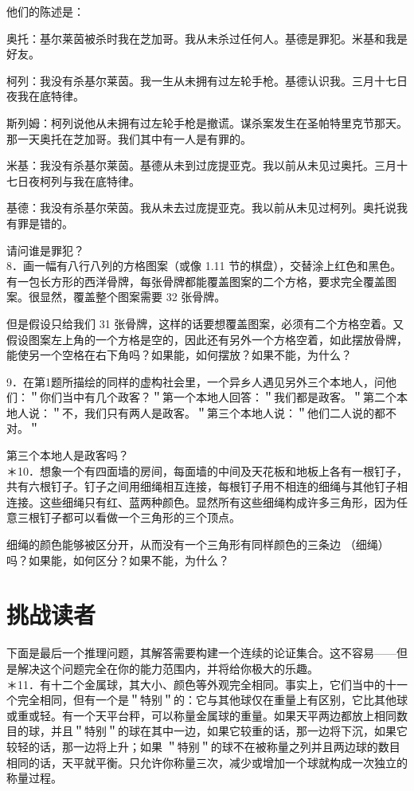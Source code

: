 他们的陈述是：

奥托：基尔莱茵被杀时我在芝加哥。我从未杀过任何人。基德是罪犯。米基和我是好友。

柯列：我没有杀基尔莱茵。我一生从未拥有过左轮手枪。基德认识我。三月十七日夜我在底特律。

斯列姆：柯列说他从未拥有过左轮手枪是撤谎。谋杀案发生在圣帕特里克节那天。那一天奥托在芝加哥。我们其中有一人是有罪的。

米基：我没有杀基尔莱茵。基德从未到过庞提亚克。我以前从未见过奥托。三月十七日夜柯列与我在底特律。

基德：我没有杀基尔荣茵。我从未去过庞提亚克。我以前从未见过柯列。奥托说我有罪是错的。

请问谁是罪犯？\\
8．画一幅有八行八列的方格图案（或像 1.11 节的棋盘），交替涂上红色和黑色。有一包长方形的西洋骨牌，每张骨牌都能覆盖图案的二个方格，要求完全覆盖图案。很显然，覆盖整个图案需要 32 张骨牌。

但是假设只给我们 31 张骨牌，这样的话要想覆盖图案，必须有二个方格空着。又假设图案左上角的一个方格是空的，因此还有另外一个方格空着，如此摆放骨牌，能使另一个空格在右下角吗？如果能，如何摆放？如果不能，为什么？

9．在第1题所描绘的同样的虚构社会里，一个异乡人遇见另外三个本地人，问他们：＂你们当中有几个政客？＂第一个本地人回答：＂我们都是政客。＂第二个本地人说：＂不，我们只有两人是政客。＂第三个本地人说：＂他们二人说的都不对。＂

第三个本地人是政客吗？\\
＊10．想象一个有四面墙的房间，每面墙的中间及天花板和地板上各有一根钉子，共有六根钉子。钉子之间用细绳相互连接，每根钉子用不相连的细绳与其他钉子相连接。这些细绳只有红、蓝两种颜色。显然所有这些细绳构成许多三角形，因为任意三根钉子都可以看做一个三角形的三个顶点。

细绳的颜色能够被区分开，从而没有一个三角形有同样颜色的三条边 （细绳）吗？如果能，如何区分？如果不能，为什么？

\section*{挑战读者}
下面是最后一个推理问题，其解答需要构建一个连续的论证集合。这不容易——但是解决这个问题完全在你的能力范围内，并将给你极大的乐趣。\\
＊11．有十二个金属球，其大小、颜色等外观完全相同。事实上，它们当中的十一个完全相同，但有一个是＂特别＂的：它与其他球仅在重量上有区别，它比其他球或重或轻。有一个天平台秤，可以称量金属球的重量。如果天平两边都放上相同数目的球，并且＂特别＂的球在其中一边，如果它较重的话，那一边将下沉，如果它较轻的话，那一边将上升；如果 ＂特别＂的球不在被称量之列并且两边球的数目相同的话，天平就平衡。只允许你称量三次，减少或增加一个球就构成一次独立的称量过程。

